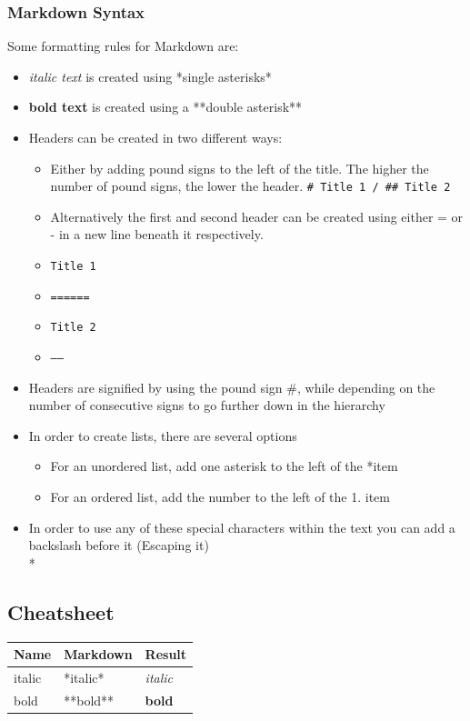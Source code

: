 \documentclass{article}
\begin{document}
	\subsubsection{Markdown Syntax}
	Some formatting rules for Markdown are:
	\begin{itemize}
		\item{\textit{italic text} is created using *single asterisks*}
		\item{\textbf{bold text} is created using a **double asterisk**}
		\item{Headers can be created in two different ways:}
		\begin{itemize}
			\item{Either by adding pound signs to the left of the title. The higher the number of pound signs, the lower the header. \verb|# Title 1 / ## Title 2|}
			\item{Alternatively the first and second header can be created using either = or - in a new line beneath it respectively.}
			\item{\texttt{Title 1}}
			\item[]{\texttt{======}}
			\item{\texttt{Title 2}}
			\item[]{\texttt{------}}
		\end{itemize}
		\item{Headers are signified by using the pound sign \#, while depending on the number of consecutive signs to go further down in the hierarchy}
		\item{In order to create lists, there are several options}
		\begin{itemize}
			\item{For an unordered list, add one asterisk to the left of the *item}
			\item{For an ordered list, add the number to the left of the 1. item}
		\end{itemize}
		\item{In order to use any of these special characters within the text you can add a backslash before it (Escaping it) \\*}
	\end{itemize}

	\newpage
	\subsection{Cheatsheet}
	\begin{tabular}{| l | l | l |}
		\toprule
		Name & Markdown & Result \\ \midrule
		italic & *italic* & \textit{italic} \\ \hline
		bold & **bold** & \textbf{bold} \\ \hline
		
		\bottomrule
	\end{tabular}
	\newpage
\end{document}
